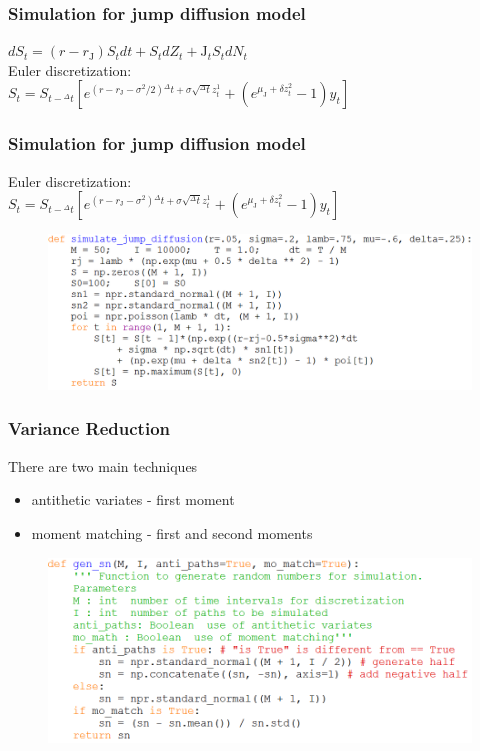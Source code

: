 \documentclass{beamer}
\begin{document}
\begin{frame}
\frametitle{Simulation for jump diffusion model}
\begin{center}
	$dS_{t} = (r-r_{\mathrm{J}})S_{t}dt + S_{t}dZ_{t}	+ {\mathrm{J}}_{t}S_{t}dN_{t}$\\[10mm]
	Euler discretization:\\[6mm]
	$S_{t} = S_{t-{^{\Delta}t}} [e^{(r-r_{\mathrm{J}}-\sigma^{2}/2){^{\Delta}t}+\sigma \sqrt{^{\Delta}t}z_{t}^{1}}+(e^{\mu_{\mathrm{J}}+\delta z_{t}^{2}}-1)y_{t}] $
\end{center}
\end{frame}

\begin{frame}
\frametitle{Simulation for jump diffusion model}
\begin{center}
	Euler discretization:\\[3mm]
	$S_{t} = S_{t-{^{\Delta}t}} [e^{(r-r_{\mathrm{J}}-\sigma^{2}){^{\Delta}t}+\sigma \sqrt{^{\Delta}t}z_{t}^{1}}+(e^{\mu_{\mathrm{J}}+\delta z_{t}^{2}}-1)y_{t}] $
\end{center}
\begin{figure}[H]
	\includegraphics[scale=0.44]{simulate_jump_diffusion.png}
\end{figure}
\end{frame}

\begin{frame}
\frametitle{Variance Reduction}
There are two main techniques
\begin{itemize}
	\item antithetic variates - first moment
	\item moment matching - first and second moments
\end{itemize}
\begin{figure}[H]
	\includegraphics[scale=0.5]{variance_reduction.png}
\end{figure}
\end{frame}
\end{document}
